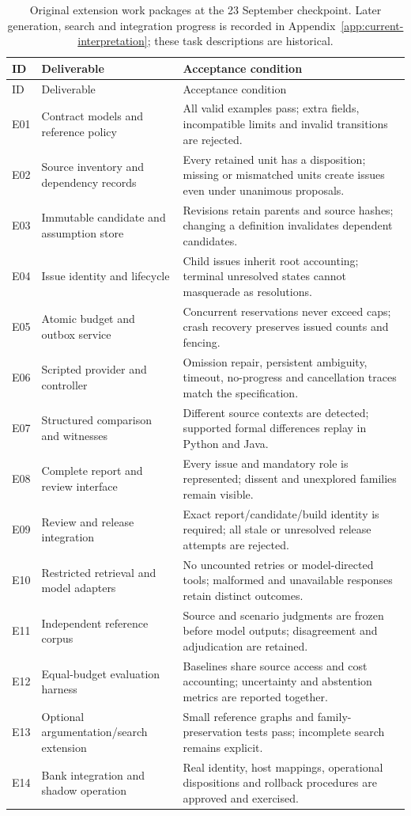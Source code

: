 \documentclass[12pt,a4paper,oneside,openany]{book}
\begin{document}
\begin{longtable}{P{13mm}P{49mm}P{85mm}}
\caption{Original extension work packages at the 23 September checkpoint.
Later generation, search and integration progress is recorded in
Appendix~\ref{app:current-interpretation}; these task descriptions are historical.}\label{tab:extension-tasks}\\
\toprule
ID & Deliverable & Acceptance condition\\\midrule\endfirsthead
\toprule ID & Deliverable & Acceptance condition\\\midrule\endhead
E01 & Contract models and reference policy & All valid examples pass; extra fields, incompatible limits and invalid transitions are rejected.\\
E02 & Source inventory and dependency records & Every retained unit has a disposition; missing or mismatched units create issues even under unanimous proposals.\\
E03 & Immutable candidate and assumption store & Revisions retain parents and source hashes; changing a definition invalidates dependent candidates.\\
E04 & Issue identity and lifecycle & Child issues inherit root accounting; terminal unresolved states cannot masquerade as resolutions.\\
E05 & Atomic budget and outbox service & Concurrent reservations never exceed caps; crash recovery preserves issued counts and fencing.\\
E06 & Scripted provider and controller & Omission repair, persistent ambiguity, timeout, no-progress and cancellation traces match the specification.\\
E07 & Structured comparison and witnesses & Different source contexts are detected; supported formal differences replay in Python and Java.\\
E08 & Complete report and review interface & Every issue and mandatory role is represented; dissent and unexplored families remain visible.\\
E09 & Review and release integration & Exact report/candidate/build identity is required; all stale or unresolved release attempts are rejected.\\
E10 & Restricted retrieval and model adapters & No uncounted retries or model-directed tools; malformed and unavailable responses retain distinct outcomes.\\
E11 & Independent reference corpus & Source and scenario judgments are frozen before model outputs; disagreement and adjudication are retained.\\
E12 & Equal-budget evaluation harness & Baselines share source access and cost accounting; uncertainty and abstention metrics are reported together.\\
E13 & Optional argumentation/search extension & Small reference graphs and family-preservation tests pass; incomplete search remains explicit.\\
E14 & Bank integration and shadow operation & Real identity, host mappings, operational dispositions and rollback procedures are approved and exercised.\\
\bottomrule
\end{longtable}
\end{document}
